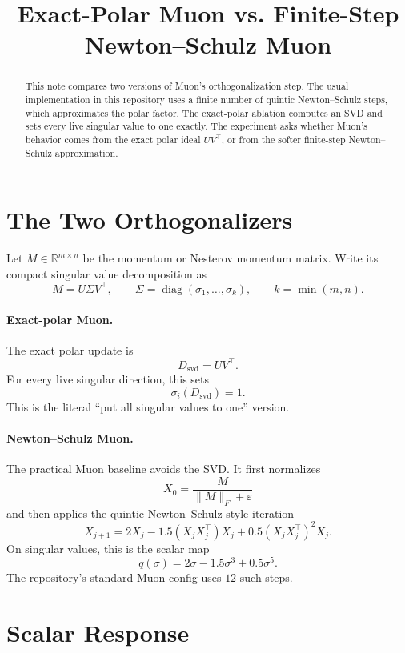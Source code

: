\documentclass{article}
\title{Exact-Polar Muon vs. Finite-Step Newton--Schulz Muon}
\author{}
\date{}
\begin{document}
\maketitle

\begin{abstract}
This note compares two versions of Muon's orthogonalization step. The usual
implementation in this repository uses a finite number of quintic
Newton--Schulz steps, which approximates the polar factor. The exact-polar
ablation computes an SVD and sets every live singular value to one exactly.
The experiment asks whether Muon's behavior comes from the exact polar ideal
\(UV^\top\), or from the softer finite-step Newton--Schulz approximation.
\end{abstract}

\section{The Two Orthogonalizers}

Let \(M \in \mathbb{R}^{m\times n}\) be the momentum or Nesterov momentum
matrix. Write its compact singular value decomposition as
\[
    M = U \Sigma V^\top,
    \qquad
    \Sigma = \operatorname{diag}(\sigma_1,\ldots,\sigma_k),
    \qquad
    k=\min(m,n).
\]

\paragraph{Exact-polar Muon.}
The exact polar update is
\[
    D_{\mathrm{svd}} = U V^\top.
\]
For every live singular direction, this sets
\[
    \sigma_i(D_{\mathrm{svd}})=1.
\]
This is the literal ``put all singular values to one'' version.

\paragraph{Newton--Schulz Muon.}
The practical Muon baseline avoids the SVD. It first normalizes
\[
    X_0 = \frac{M}{\|M\|_F+\varepsilon}
\]
and then applies the quintic Newton--Schulz-style iteration
\[
    X_{j+1}
    =
    2X_j
    -
    1.5(X_jX_j^\top)X_j
    +
    0.5(X_jX_j^\top)^2X_j.
\]
On singular values, this is the scalar map
\[
    q(\sigma)
    =
    2\sigma - 1.5\sigma^3 + 0.5\sigma^5.
\]
The repository's standard Muon config uses \(12\) such steps.

\section{Scalar Response}
\end{document}
